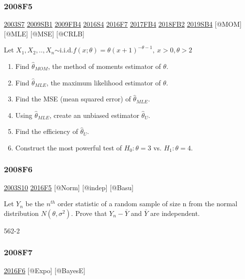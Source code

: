\documentclass[6pt,Portrait]{article}
\begin{document}
\hypertarget{f5-3}{%
\subsubsection{2008F5}\label{f5-3}}

\protect\hyperlink{s7}{2003S7} \protect\hyperlink{sb1}{2009SB1}
\protect\hyperlink{fb4}{2009FB4} \protect\hyperlink{s4-4}{2016S4}
\protect\hyperlink{f7-5}{2016F7} \protect\hyperlink{fb4-3}{2017FB4}
\protect\hyperlink{fb2-4}{2018FB2} \protect\hyperlink{sb4-2}{2019SB4}
{[}@MOM{]} {[}@MLE{]} {[}@MSE{]} {[}@CRLB{]}

Let
\(X_1,X_2,..,X_n\)\(\sim\)i.i.d.\(f(x;\theta)=\theta(x+1)^{-\theta-1},\ x>0,\theta>2\)

\begin{enumerate}
\def\labelenumi{\alph{enumi}.}
\item
  Find \(\hat\theta_{MOM}\), the method of moments estimator of
  \(\theta\).
\item
  Find \(\hat\theta_{MLE}\), the maximum likelihood estimator of
  \(\theta\).
\item
  Find the MSE (mean squared error) of \(\hat\theta_{MLE}\).
\item
  Using \(\hat\theta_{MLE}\), create an unbiased estimator
  \(\hat\theta_{U}\).
\item
  Find the efficiency of \(\hat\theta_{U}\).
\item
  Construct the most powerful test of \(H_0:\theta=3\) vs.
  \(H_1:\theta=4\).
\end{enumerate}

\hypertarget{f6-3}{%
\subsubsection{2008F6}\label{f6-3}}

\protect\hyperlink{s10}{2003S10} \protect\hyperlink{f5-6}{2016F5}
{[}@Norm{]} {[}@indep{]} {[}@Basu{]}

Let \(Y_n\) be the \(n^{th}\) order statistic of a random sample of size
n from the normal distribution \(N(\theta,\sigma^2)\). Prove that
\(Y_n-\bar Y\) and \(\bar Y\) are independent.

562-2

\hypertarget{f7-3}{%
\subsubsection{2008F7}\label{f7-3}}

\protect\hyperlink{f6-5}{2016F6} {[}@Expo{]} {[}@BayesE{]}
\end{document}
